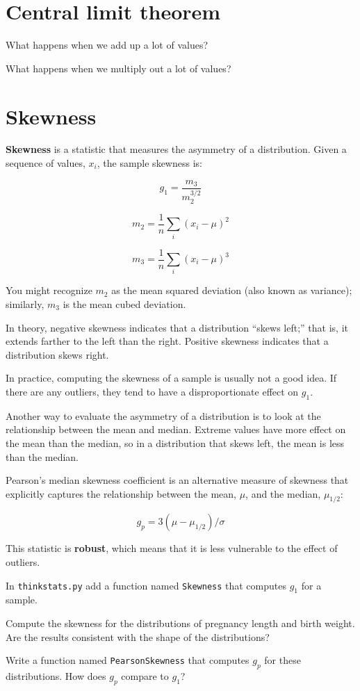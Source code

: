 \documentclass[12pt]{book}
\begin{document}
\section{Central limit theorem}

What happens when we add up a lot of values?

What happens when we multiply out a lot of values?


\section{Skewness}

{\bf Skewness} is a statistic that measures the asymmetry of a
distribution.  Given a sequence of values, $x_i$, the sample skewness
is:

\[ g_1 = \frac{m_3}{m_2^{3/2}}\]

\[ m_2 = \frac{1}{n} \sum_i (x_i - \mu)^2 \]

\[ m_3 = \frac{1}{n} \sum_i (x_i - \mu)^3 \]

You might recognize $m_2$ as the mean squared deviation (also known as
variance); similarly, $m_3$ is the mean cubed deviation.

In theory, negative skewness indicates that a distribution 
``skews left;'' that is, it extends
farther to the left than the right.  Positive skewness indicates
that a distribution skews right.

In practice, computing the skewness of a sample is usually not
a good idea.  If there are any outliers, they tend to
have a disproportionate effect on $g_1$.

Another way to evaluate the asymmetry of a distribution is to look
at the relationship between the mean and median.
Extreme values have more effect on the mean than the median, so
in a distribution that skews left, the mean is less than the median.

Pearson's median skewness coefficient is an alternative measure of
skewness that explicitly captures the relationship between the mean,
$\mu$, and the median, $\mu_{1/2}$:

\[ g_p = 3 (\mu - \mu_{1/2}) / \sigma \]

This statistic is {\bf robust}, which means that it is less vulnerable
to the effect of outliers.

\begin{ex}

In {\tt thinkstats.py} add a function named {\tt Skewness} that computes
$g_1$ for a sample.

Compute the skewness for the distributions of pregnancy length and
birth weight.  Are the results consistent with the shape of the
distributions?

Write a function named {\tt PearsonSkewness} that computes $g_p$
for these distributions.  How does $g_p$ compare to $g_1$?

\end{ex}
\end{document}
